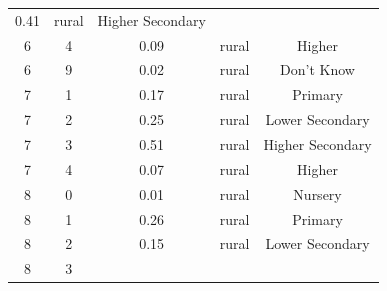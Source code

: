 \documentclass[stu, 12pt, floatsintext,longtable]{apa7}
\begin{document}
\begin{longtable}{ccccc}
    0.41
                                                       &
    rural                                              & Higher Secondary
    \\
    6                                                  & 4                    &
    0.09
                                                       &
    rural                                              & Higher
    \\
    6                                                  & 9                    &
    0.02
                                                       &
    rural                                              & Don't Know
    \\
    7                                                  & 1                    &
    0.17
                                                       &
    rural                                              & Primary
    \\
    7                                                  & 2                    &
    0.25
                                                       &
    rural                                              & Lower Secondary
    \\
    7                                                  & 3                    &
    0.51
                                                       &
    rural                                              & Higher Secondary
    \\
    7                                                  & 4                    &
    0.07
                                                       &
    rural                                              & Higher
    \\
    8                                                  & 0                    &
    0.01
                                                       &
    rural                                              & Nursery
    \\
    8                                                  & 1                    &
    0.26
                                                       &
    rural                                              & Primary
    \\
    8                                                  & 2                    &
    0.15
                                                       &
    rural                                              & Lower Secondary
    \\
    8                                                  & 3                    &

\end{longtable}
\end{document}
